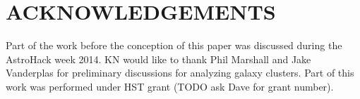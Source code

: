 \section{ACKNOWLEDGEMENTS}
Part of the work before the conception of this paper was discussed during 
the AstroHack week 2014. KN would like to thank Phil
Marshall and Jake Vanderplas for preliminary discussions for analyzing galaxy clusters. 
Part of this work was performed under HST grant (TODO ask Dave for grant
number). 







